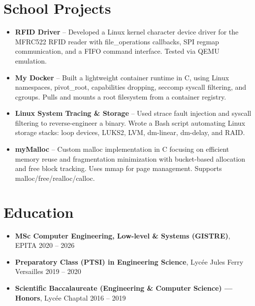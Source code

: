 \documentclass[9pt,a4paper]{article}
\begin{document}
\section*{School Projects}
\begin{tcolorbox}[mybox]
\begin{itemize}
\item \textbf{RFID Driver} -- Developed a Linux kernel character device driver for the MFRC522 RFID reader with file\_operations callbacks, SPI regmap communication, and a FIFO command interface. Tested via QEMU emulation.

\item \textbf{My Docker} -- Built a lightweight container runtime in C, using Linux namespaces, pivot\_root, capabilities dropping, seccomp syscall filtering, and cgroups. Pulls and mounts a root filesystem from a container registry.

\item \textbf{Linux System Tracing \& Storage} -- Used strace fault injection and syscall filtering to reverse-engineer a binary. Wrote a Bash script automating Linux storage stacks: loop devices, LUKS2, LVM, dm-linear, dm-delay, and RAID.

\item \textbf{myMalloc} -- Custom malloc implementation in C focusing on efficient memory reuse and fragmentation minimization with bucket-based allocation and free block tracking. Uses mmap for page management. Supports malloc/free/realloc/calloc.
\end{itemize}
\end{tcolorbox}


\section*{Education}
\begin{tcolorbox}[mybox]
\begin{itemize}
\item \textbf{MSc Computer Engineering, Low-level \& Systems (GISTRE)}, EPITA {\small{\hfill 2020 – 2026}}

\item \textbf{Preparatory Class (PTSI) in Engineering Science}, Lycée Jules Ferry Versailles {\small{\hfill 2019 – 2020}}

\item \textbf{Scientific Baccalaureate (Engineering \& Computer Science) — Honors}, Lycée Chaptal {\small{\hfill 2016 – 2019}}
\end{itemize}
\end{tcolorbox}
\end{document}
